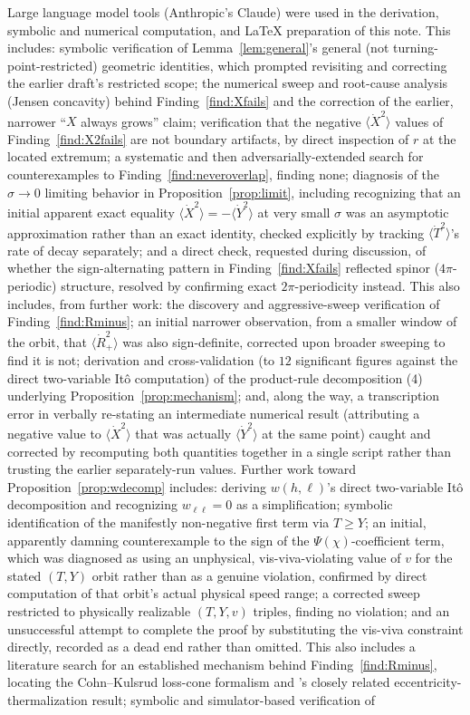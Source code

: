 \documentclass[12pt]{amsart}
\theoremstyle{plain}
\theoremstyle{remark}
\begin{document}
Large language model tools (Anthropic's Claude) were used in the derivation, symbolic and numerical computation, and \LaTeX{} preparation of this note. This includes: symbolic verification of Lemma~\ref{lem:general}'s general (not turning-point-restricted) geometric identities, which prompted revisiting and correcting the earlier draft's restricted scope; the numerical sweep and root-cause analysis (Jensen concavity) behind Finding~\ref{find:Xfails} and the correction of the earlier, narrower ``$X$ always grows'' claim; verification that the negative $\langle\dot X^2\rangle$ values of Finding~\ref{find:X2fails} are not boundary artifacts, by direct inspection of $r$ at the located extremum; a systematic and then adversarially-extended search for counterexamples to Finding~\ref{find:neveroverlap}, finding none; diagnosis of the $\sigma\to0$ limiting behavior in Proposition~\ref{prop:limit}, including recognizing that an initial apparent exact equality $\langle\dot X^2\rangle=-\langle\dot Y^2\rangle$ at very small $\sigma$ was an asymptotic approximation rather than an exact identity, checked explicitly by tracking $\langle\dot T^2\rangle$'s rate of decay separately; and a direct check, requested during discussion, of whether the sign-alternating pattern in Finding~\ref{find:Xfails} reflected spinor ($4\pi$-periodic) structure, resolved by confirming exact $2\pi$-periodicity instead. This also includes, from further work: the discovery and aggressive-sweep verification of Finding~\ref{find:Rminus}; an initial narrower observation, from a smaller window of the orbit, that $\langle\dot R_+^2\rangle$ was also sign-definite, corrected upon broader sweeping to find it is not; derivation and cross-validation (to $12$ significant figures against the direct two-variable It\^o computation) of the product-rule decomposition (4) underlying Proposition~\ref{prop:mechanism}; and, along the way, a transcription error in verbally re-stating an intermediate numerical result (attributing a negative value to $\langle\dot X^2\rangle$ that was actually $\langle\dot Y^2\rangle$ at the same point) caught and corrected by recomputing both quantities together in a single script rather than trusting the earlier separately-run values. Further work toward Proposition~\ref{prop:wdecomp} includes: deriving $w(h,\ell)$'s direct two-variable It\^o decomposition and recognizing $w_{\ell\ell}=0$ as a simplification; symbolic identification of the manifestly non-negative first term via $T\geq Y$; an initial, apparently damning counterexample to the sign of the $\Psi(\chi)$-coefficient term, which was diagnosed as using an unphysical, vis-viva-violating value of $v$ for the stated $(T,Y)$ orbit rather than as a genuine violation, confirmed by direct computation of that orbit's actual physical speed range; a corrected sweep restricted to physically realizable $(T,Y,v)$ triples, finding no violation; and an unsuccessful attempt to complete the proof by substituting the vis-viva constraint directly, recorded as a dead end rather than omitted. This also includes a literature search for an established mechanism behind Finding~\ref{find:Rminus}, locating the Cohn--Kulsrud loss-cone formalism and \cite{HamiltonModak2024}'s closely related eccentricity-thermalization result; symbolic and simulator-based verification of 
\end{document}

